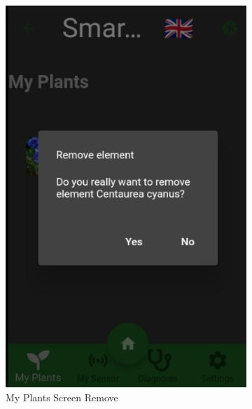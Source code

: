\documentclass[a4paper,12pt]{report}
\begin{document}
\begin{figure}[H]
\begin{subfigure}{0.3\textwidth}
		\includegraphics[width=\textwidth]{./images/my_plants/my_plants_screen3_remove.png}
		\caption{My Plants Screen Remove}
		\label{fig:my_plants_remove}
	\end{subfigure}
	\hfill
	\begin{subfigure}{0.3\textwidth}

\end{subfigure}
\end{figure}
\end{document}
